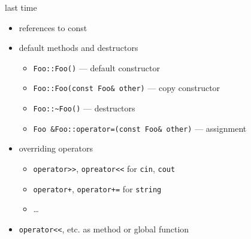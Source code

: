 \begin{frame}[fragile,label=lastTime]{last time}
\lstset{language=C++,style=small}
    \begin{itemize}
    \item references to const
    \item default methods and destructors
        \begin{itemize}
            \item \lstinline|Foo::Foo()| --- default constructor
            \item \lstinline|Foo::Foo(const Foo& other)| --- copy constructor
            \item \lstinline|Foo::~Foo()| --- destructors
            \item \lstinline|Foo &Foo::operator=(const Foo& other)| --- assignment
        \end{itemize}
    \item overriding operators
        \begin{itemize}
            \item \lstinline|operator>>|, \lstinline|opreator<<| for \lstinline|cin|, \lstinline|cout|
            \item \lstinline|operator+|, \lstinline|operator+=| for \lstinline|string|
            \item \ldots
        \end{itemize}
    \item \lstinline|operator<<|, etc. as method or global function
    \end{itemize}
\end{frame}
